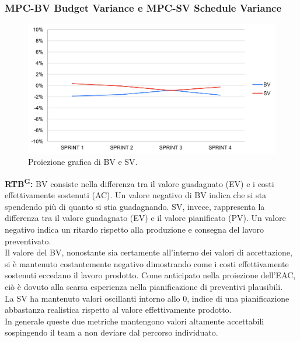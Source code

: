 \documentclass[8pt]{article}
\newcommand{\glossterm}[1]{#1\textsuperscript{G}} %
\begin{document}
\subsubsection{MPC-BV Budget Variance e MPC-SV Schedule Variance}
\begin{figure}[h!]
    \centering
    \includegraphics[width=1\textwidth]{images/BV_SV.png}
    \caption{Proiezione grafica di BV e SV.}
    \label{fig:Proiezione grafica di BV e SV}
\end{figure}
\textbf{\glossterm{RTB}:} BV consiste nella differenza tra il valore guadagnato (EV) e i costi effettivamente sostenuti (AC). Un valore negativo di BV indica che si sta spendendo più di quanto si stia guadagnando. SV, invece, rappresenta la differenza tra il valore guadagnato (EV) e il valore pianificato (PV). Un valore negativo indica un ritardo rispetto alla produzione e consegna del lavoro preventivato.\\
Il valore del BV, nonostante sia certamente all'interno dei valori di accettazione, si è mantenuto costantemente negativo dimostrando come i costi effettivamente sostenuti eccedano il lavoro prodotto. Come anticipato nella proiezione dell'EAC, ciò è dovuto alla scarsa esperienza nella pianificazione di preventivi plausibili.\\
La SV ha mantenuto valori oscillanti intorno allo 0, indice di una pianificazione abbastanza realistica rispetto al valore effettivamente prodotto.\\
In generale queste due metriche mantengono valori altamente accettabili sospingendo il team a non deviare dal percorso individuato.
\clearpage
\end{document}
